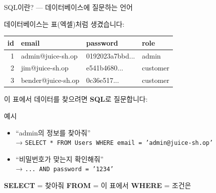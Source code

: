 \documentclass[aspectratio=169,10pt]{beamer}
\begin{document}
\begin{frame}[shrink=5]{SQL이란? — 데이터베이스에 질문하는 언어}

데이터베이스는 표(엑셀)처럼 생겼습니다:

\vspace{0.3em}
\begin{center}
\begin{tabular}{rlll}
\toprule
\textbf{id} & \textbf{email} & \textbf{password} & \textbf{role} \\
\midrule
1 & admin@juice-sh.op & 0192023a7bbd... & admin \\
2 & jim@juice-sh.op & e541b4680... & customer \\
3 & bender@juice-sh.op & 0c36e517... & customer \\
\bottomrule
\end{tabular}
\end{center}

\vspace{0.3em}
이 표에서 데이터를 찾으려면 \textbf{SQL}로 질문합니다:

\vspace{0.3em}
\begin{block}{예시}
\begin{itemize}
    \item ``admin의 정보를 찾아줘'' \\
          → \texttt{SELECT * FROM Users WHERE email = 'admin@juice-sh.op'}
    \item ``비밀번호가 맞는지 확인해줘'' \\
          → \texttt{... AND password = '1234'}
\end{itemize}
\end{block}

{\footnotesize \textbf{SELECT} = 찾아줘 \quad \textbf{FROM} = 이 표에서 \quad \textbf{WHERE} = 조건은}
\end{frame}
\end{document}
